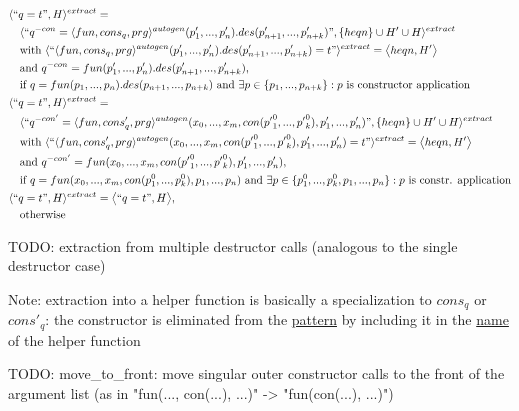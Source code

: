 \documentclass[11pt]{article} %
\begin{document}
\begin{alignat*}{2}
& \langle `` q = t ", H \rangle^{extract} = \\
&\quad \langle `` q^{-con} = \langle fun, cons_q, prg \rangle^{autogen}(p'_1, ..., p'_n).des(p'_{n+1}, ..., p'_{n+k}) ", \{heqn\} \cup H' \cup H \rangle^{extract} \\
&\quad \textrm{with } \langle `` \langle fun, cons_q, prg \rangle^{autogen}(p'_1, ..., p'_n).des(p'_{n+1}, ..., p'_{n+k}) = t " \rangle^{extract} = \big\langle heqn, H' \big\rangle \\
&\quad \textrm{and } q^{-con} = fun(p'_1, ..., p'_{n}).des(p'_{n+1}, ..., p'_{n+k}), \\
&\quad \textrm{if } q = fun(p_1, ..., p_n).des(p_{n+1}, ..., p_{n+k})\textrm{ and } \exists p \in \{p_1, ..., p_{n+k}\}: p \textrm{ is constructor application} \\
& \langle ``q = t ", H \rangle^{extract} = \\
&\quad \langle `` q^{-con'} = \langle fun, cons'_q, prg \rangle^{autogen}(x_0, ..., x_m, con({p'}_1^0, ..., {p'}_k^0), p'_1, ..., p'_n) ", \{heqn\} \cup H' \cup H \rangle^{extract} \\
&\quad \textrm{with } \langle `` \langle fun, cons'_q, prg \rangle^{autogen}(x_0, ..., x_m, con({p'}_1^0, ..., {p'}_k^0), p'_1, ..., p'_n) = t " \rangle^{extract} = \big\langle heqn, H' \big\rangle \\
&\quad \textrm{and } q^{-con'} = fun(x_0, ..., x_m, con({p'}_1^0, ..., {p'}_k^0), p'_1, ..., p'_n), \\
&\quad \textrm{if } q = fun(x_0, ..., x_m, con(p^0_1, ..., p^0_k), p_1, ..., p_n) \textrm{ and } \exists p \in \{p^0_1, ..., p^0_k, p_1, ..., p_n\}: p \textrm{ is constr. application} \\
& \langle `` q = t ", H \rangle^{extract} = \big\langle ``q = t ", H \big\rangle, \\
&\quad \textrm{otherwise}
\end{alignat*}

TODO: extraction from multiple destructor calls (analogous to the single destructor case)

Note: extraction into a helper function is basically a specialization to $cons_q$ or $cons'_q$: the constructor is eliminated from the \underline{pattern} by including it in the \underline{name} of the helper function

TODO: move\_to\_front: move singular outer constructor calls to the front of the argument list (as in "fun(..., con(...), ...)" -> "fun(con(...), ...)")
\end{document}
